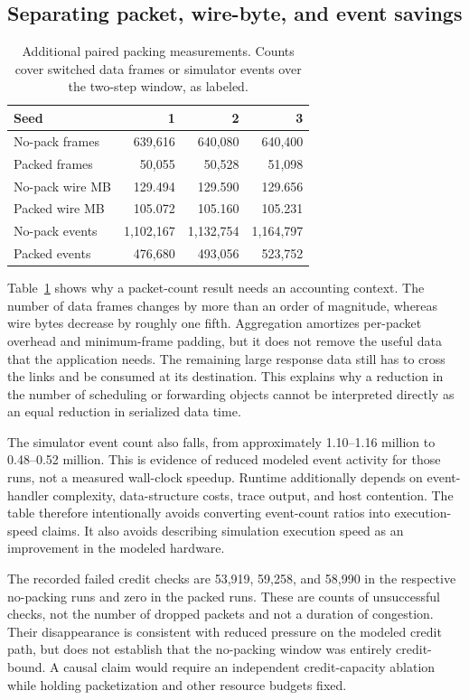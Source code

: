 \subsection{Separating packet, wire-byte, and event savings}
\begin{table}[t]
\centering
\caption{Additional paired packing measurements. Counts cover switched data frames or simulator events over the two-step window, as labeled.}
\label{tab:packing-accounting}
\small
\begin{tabular}{lrrr}\toprule
Seed & 1 & 2 & 3\\\midrule
No-pack frames & 639,616 & 640,080 & 640,400\\
Packed frames & 50,055 & 50,528 & 51,098\\
No-pack wire MB & 129.494 & 129.590 & 129.656\\
Packed wire MB & 105.072 & 105.160 & 105.231\\
No-pack events & 1,102,167 & 1,132,754 & 1,164,797\\
Packed events & 476,680 & 493,056 & 523,752\\\bottomrule
\end{tabular}
\end{table}

Table~\ref{tab:packing-accounting} shows why a packet-count result needs an accounting context. The number of data frames changes by more than an order of magnitude, whereas wire bytes decrease by roughly one fifth. Aggregation amortizes per-packet overhead and minimum-frame padding, but it does not remove the useful data that the application needs. The remaining large response data still has to cross the links and be consumed at its destination. This explains why a reduction in the number of scheduling or forwarding objects cannot be interpreted directly as an equal reduction in serialized data time.

The simulator event count also falls, from approximately 1.10--1.16 million to 0.48--0.52 million. This is evidence of reduced modeled event activity for those runs, not a measured wall-clock speedup. Runtime additionally depends on event-handler complexity, data-structure costs, trace output, and host contention. The table therefore intentionally avoids converting event-count ratios into execution-speed claims. It also avoids describing simulation execution speed as an improvement in the modeled hardware.

The recorded failed credit checks are 53,919, 59,258, and 58,990 in the respective no-packing runs and zero in the packed runs. These are counts of unsuccessful checks, not the number of dropped packets and not a duration of congestion. Their disappearance is consistent with reduced pressure on the modeled credit path, but does not establish that the no-packing window was entirely credit-bound. A causal claim would require an independent credit-capacity ablation while holding packetization and other resource budgets fixed.


